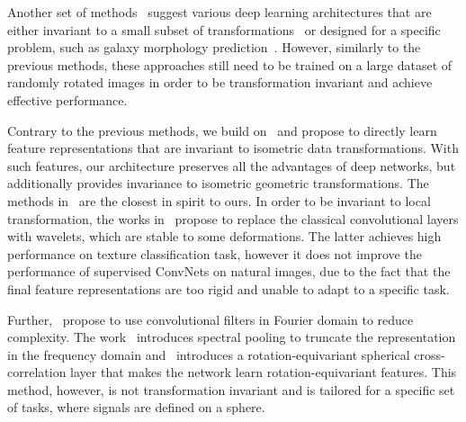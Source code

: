 \documentclass[10pt,journal,compsoc]{IEEEtran}
\begin{document}
	Another set of methods~\cite{bb:cohen2016group, bb:dieleman2015rotation, bb:dieleman-cyclic-2016} suggest various deep learning architectures that are either invariant to a small subset of transformations~\cite{bb:cohen2016group, bb:dieleman-cyclic-2016} or designed for a specific problem, such as galaxy morphology prediction~\cite{bb:dieleman2015rotation}. However, similarly to the previous methods, these approaches still need to be trained on a large dataset of randomly rotated images in order to be transformation invariant and achieve effective performance.


	Contrary to the previous methods, we build on~\cite{bb:KhasanovaF17} and propose to directly learn feature representations that are invariant to isometric data transformations. With such features, our architecture preserves all the advantages of deep networks, but additionally provides invariance to isometric geometric transformations. The methods in~\cite{bb:oyallon2015deep, bb:bruna2013invariant, bb:harm} are the closest in spirit to ours. In order to be invariant to local transformation, the works in~\cite{bb:oyallon2015deep, bb:bruna2013invariant} propose to replace the classical convolutional layers with wavelets, which are stable to some deformations. The latter achieves high performance on texture classification task, however it does not improve the performance of supervised ConvNets on natural images, due to the fact that the final feature representations are too rigid and unable to adapt to a specific task.

	Further,~\cite{bb:rev1, bb:Cohen2018, bb:rev2} propose to use convolutional filters in Fourier domain to reduce complexity. The work~\cite{bb:rev2} introduces spectral pooling to truncate the representation in the frequency domain and~\cite{bb:Cohen2018} introduces a rotation-equivariant spherical cross-correlation layer that makes the network learn rotation-equivariant features. This method, however, is not transformation invariant and is tailored for a specific set of tasks, where signals are defined on a sphere.
\end{document}
